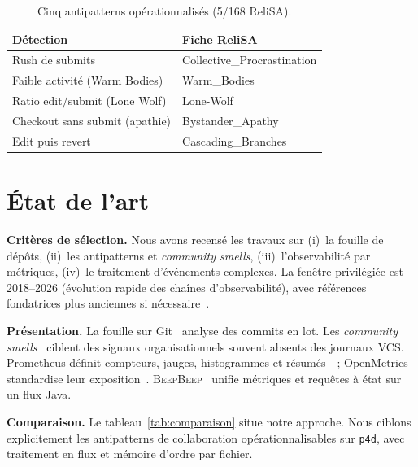 \documentclass[conference]{IEEEtran}
\newcommand{\beepbeep}{\textsc{BeepBeep}}
\begin{document}
\begin{table}[!t]
  \caption{Cinq antipatterns opérationnalisés (5/168 ReliSA).}
  \label{tab:relisa}
  \centering
  \small
  \begin{tabular}{ll}
    \toprule
    \textbf{Détection} & \textbf{Fiche ReliSA} \\
    \midrule
    Rush de submits & Collective\_Procrastination \\
    Faible activité (Warm Bodies) & Warm\_Bodies \\
    Ratio edit/submit (Lone Wolf) & Lone-Wolf \\
    Checkout sans submit (apathie) & Bystander\_Apathy \\
    Edit puis revert & Cascading\_Branches \\
    \bottomrule
  \end{tabular}
\end{table}

\section{\'Etat de l'art}
\label{sec:etat}

\textbf{Critères de sélection.}
Nous avons recensé les travaux sur (i)~la fouille de dépôts,
(ii)~les antipatterns et \emph{community smells}, (iii)~l'observabilité
par métriques, (iv)~le traitement d'événements complexes. La fenêtre
privilégiée est 2018--2026 (évolution rapide des chaînes
d'observabilité), avec références fondatrices plus anciennes si
nécessaire~\cite{luckham2002power,brown1998antipatterns}.

\textbf{Présentation.}
La fouille sur Git~\cite{hindle2008mining} analyse des commits en lot.
Les \emph{community smells}~\cite{tamburri2019community} ciblent des
signaux organisationnels souvent absents des journaux VCS. Prometheus
définit compteurs, jauges, histogrammes et
résumés~\cite{brazil2018prometheus,prometheus_metric_types}~;
OpenMetrics standardise leur
exposition~\cite{openmetrics}. \beepbeep{}~\cite{halle2018beepbeep}
unifie métriques et requêtes à état sur un flux Java.

\textbf{Comparaison.}
Le tableau~\ref{tab:comparaison} situe notre approche. Nous ciblons
explicitement les antipatterns de collaboration opérationnalisables sur
\texttt{p4d}, avec traitement en flux et mémoire d'ordre par fichier.
\end{document}
